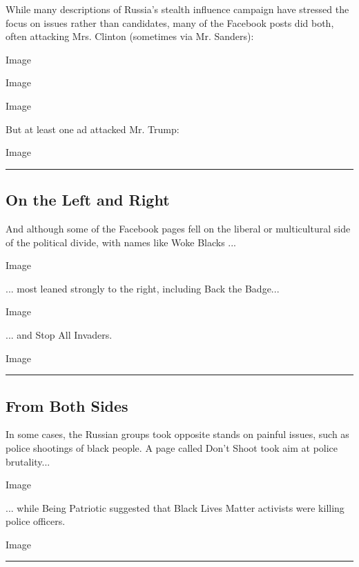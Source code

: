 While many descriptions of Russia's stealth influence campaign have
stressed the focus on issues rather than candidates, many of the
Facebook posts did both, often attacking Mrs. Clinton (sometimes via Mr.
Sanders):

Image

Image

Image

But at least one ad attacked Mr. Trump:

Image

\begin{center}\rule{0.5\linewidth}{\linethickness}\end{center}

\hypertarget{on-the-left-and-right}{%
\subsection{On the Left and Right}\label{on-the-left-and-right}}

And although some of the Facebook pages fell on the liberal or
multicultural side of the political divide, with names like Woke Blacks
...

Image

... most leaned strongly to the right, including Back the Badge...

Image

... and Stop All Invaders.

Image

\begin{center}\rule{0.5\linewidth}{\linethickness}\end{center}

\hypertarget{from-both-sides}{%
\subsection{From Both Sides}\label{from-both-sides}}

In some cases, the Russian groups took opposite stands on painful
issues, such as police shootings of black people. A page called Don't
Shoot took aim at police brutality...

Image

... while Being Patriotic suggested that Black Lives Matter activists
were killing police officers.

Image

\begin{center}\rule{0.5\linewidth}{\linethickness}\end{center}

